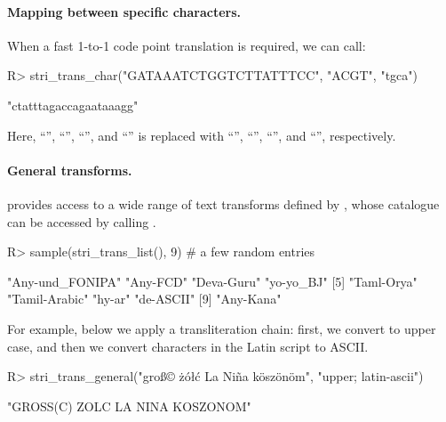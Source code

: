 \documentclass[nojss]{jss}
\begin{document}
\paragraph{Mapping between specific characters.}
When a fast 1-to-1 code point translation is required, we can call:

\begin{Schunk}
\begin{Sinput}
R> stri_trans_char("GATAAATCTGGTCTTATTTCC", "ACGT", "tgca")
\end{Sinput}
\begin{Soutput}
[1] "ctatttagaccagaataaagg"
\end{Soutput}
\end{Schunk}

Here, ``'', ``'', ``'', and ``''
is replaced with
``'', ``'', ``'', and ``'', respectively.



\paragraph{General transforms.}
 provides access to a wide range of text transforms
defined by , whose catalogue can be accessed by calling
.

\begin{Schunk}
\begin{Sinput}
R> sample(stri_trans_list(), 9)  # a few random entries
\end{Sinput}
\begin{Soutput}
[1] "Any-und_FONIPA" "Any-FCD"        "Deva-Guru"      "yo-yo_BJ"
[5] "Taml-Orya"      "Tamil-Arabic"   "hy-ar"          "de-ASCII"
[9] "Any-Kana"
\end{Soutput}
\end{Schunk}

For example, below we apply a transliteration chain:
first, we convert to upper case, and then we convert characters
in the Latin script to ASCII.


\begin{Schunk}
\begin{Sinput}
R> stri_trans_general("groß© żółć La Niña köszönöm", "upper; latin-ascii")
\end{Sinput}
\begin{Soutput}
[1] "GROSS(C) ZOLC LA NINA KOSZONOM"
\end{Soutput}
\end{Schunk}
\end{document}
